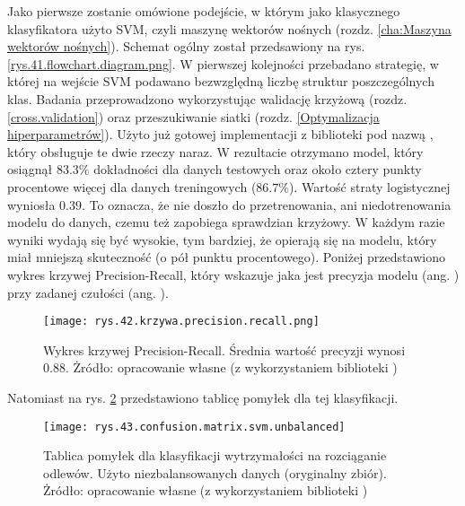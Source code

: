 Jako pierwsze zostanie omówione podejście, w którym jako klasycznego klasyfikatora użyto SVM, czyli maszynę wektorów nośnych (rozdz. \ref{cha:Maszyna wektorów nośnych}). Schemat ogólny został przedsawiony na rys. \ref{rys.41.flowchart.diagram.png}. W pierwszej kolejności przebadano strategię, w której na wejście SVM podawano bezwzględną liczbę struktur poszczególnych klas. Badania przeprowadzono wykorzystując walidację krzyżową (rozdz. \ref{cross.validation}) oraz przeszukiwanie siatki (rozdz. \ref{Optymalizacja hiperparametrów}). Użyto już gotowej implementacji z biblioteki  pod nazwą , który obsługuje te dwie rzeczy naraz. W rezultacie otrzymano model, który osiągnął $83.3\%$ dokładności dla danych testowych oraz około cztery punkty procentowe więcej dla danych treningowych ($86.7\%$). Wartość straty logistycznej wyniosła $0.39$. To oznacza, że nie doszło do przetrenowania, ani niedotrenowania modelu do danych, czemu też zapobiega sprawdzian krzyżowy. W każdym razie wyniki wydają się być wysokie, tym bardziej, że opierają się na modelu, który miał mniejszą skuteczność (o pół punktu procentowego). Poniżej przedstawiono wykres krzywej Precision-Recall, który wskazuje jaka jest precyzja modelu (ang. ) przy zadanej czułości (ang. ). 
\begin{figure}[h]
    \centering
    \texttt{[image: rys.42.krzywa.precision.recall.png]}
    \caption{Wykres krzywej Precision-Recall. Średnia wartość precyzji wynosi 0.88. Żródło: opracowanie własne (z wykorzystaniem biblioteki )}
    \label{rys.42.krzywa.precision.recall.png}
\end{figure}
Natomiast na rys. \ref{rys.43.confusion.matrix.svm.unbalanced} przedstawiono tablicę pomyłek dla tej klasyfikacji.
\begin{figure}[h]
    \centering
    \texttt{[image: rys.43.confusion.matrix.svm.unbalanced]}
    \caption{Tablica pomyłek dla klasyfikacji wytrzymałości na rozciąganie odlewów. Użyto niezbalansowanych danych (oryginalny zbiór). Żródło: opracowanie własne (z wykorzystaniem biblioteki )}
    \label{rys.43.confusion.matrix.svm.unbalanced}
\end{figure}

